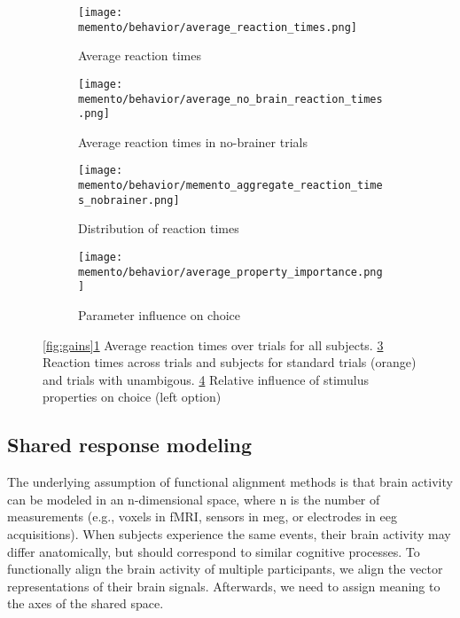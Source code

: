 \begin{figure}
	\centering
	\begin{subfigure}[t]{0.4\textwidth}
		\texttt{[image: memento/behavior/average\_reaction\_times.png]}
		\caption{Average reaction times}
		\label{fig:avgreactions}
	\end{subfigure}
	\begin{subfigure}[t]{0.4\textwidth}
		\texttt{[image: memento/behavior/average\_no\_brain\_reaction\_times.png]}
		\caption{Average reaction times in no-brainer trials}
		\label{fig:avgreactionsnobrain}
	\end{subfigure}
	\begin{subfigure}[t]{0.45\textwidth}
		\texttt{[image: memento/behavior/memento\_aggregate\_reaction\_times\_nobrainer.png]}
		\caption{Distribution of reaction times}
		\label{fig:reactiontimes}
	\end{subfigure}
	\begin{subfigure}[t]{0.45\textwidth}
		\texttt{[image: memento/behavior/average\_property\_importance.png]}
		\caption{Parameter influence on choice}
		\label{fig:logregbehavior}
	\end{subfigure}

	\caption[Behavioral results]{\ref{fig:gains}\ref{fig:avgreactions} Average reaction times over trials for all subjects. \ref{fig:reactiontimes} Reaction times across trials and subjects for standard trials (orange) and trials with unambigous. \ref{fig:logregbehavior} Relative influence of stimulus properties on choice (left option)}
	\label{fig:behav}
\end{figure}


\subsection{Shared response modeling}

The underlying assumption of functional alignment methods is that brain activity can be modeled in an n-dimensional space, where n is the number of measurements (e.g., voxels in \gls{fMRI}, sensors in \gls{meg}, or electrodes in \gls{eeg} acquisitions).
When subjects experience the same events, their brain activity may differ anatomically, but should correspond to similar cognitive processes.
To functionally align the brain activity of multiple participants, we align the vector representations of their brain signals.
Afterwards, we need to assign meaning to the axes of the shared space.

